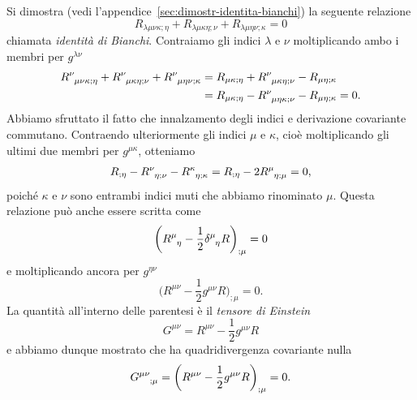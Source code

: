 Si dimostra (vedi l'appendice~\ref{sec:dimostr-identita-bianchi}) la seguente
relazione
\begin{equation}
  \label{eq:bianchi}
  R_{\lambda\mu\nu\kappa;\eta} + R_{\lambda\mu\kappa\eta;\nu} +
  R_{\lambda\mu\eta\nu;\kappa} = 0
\end{equation}
chiamata \emph{identità di Bianchi}.  Contraiamo gli
indici $\lambda$ e $\nu$ moltiplicando ambo i membri per $g^{\lambda\nu}$
\begin{equation}
  \begin{split}
    \tensor{R}{^{\nu}_{\mu\nu\kappa;\eta}} +
      \tensor{R}{^{\nu}_{\mu\kappa\eta;\nu}} +
    \tensor{R}{^{\nu}_{\mu\eta\nu;\kappa}} &= R_{\mu\kappa;\eta} +
    \tensor{R}{^{\nu}_{\mu\kappa\eta;\nu}} - R_{\mu\eta;\kappa} \\
    &= R_{\mu\kappa;\eta} - \tensor{R}{^{\nu}_{\mu\eta\kappa;\nu}} -
    R_{\mu\eta;\kappa} = 0.
  \end{split}
\end{equation}
Abbiamo sfruttato il fatto che innalzamento degli indici e derivazione
covariante commutano.  Contraendo ulteriormente gli indici $\mu$ e $\kappa$,
cioè moltiplicando gli ultimi due membri per $g^{\mu\kappa}$, otteniamo
\begin{equation}
  R_{;\eta} - \tensor{R}{^{\nu}_{\eta;\nu}} -
  \tensor{R}{^{\kappa}_{\eta;\kappa}} = R_{;\eta} - 2
  \tensor{R}{^{\mu}_{\eta;\mu}} = 0,
\end{equation}
poiché $\kappa$ e $\nu$ sono entrambi indici muti che abbiamo rinominato $\mu$.
Questa relazione può anche essere scritta come
\begin{equation}
  \bigg( \tensor{R}{^{\mu}_{\eta}} - \frac{1}{2} \tensor{\delta}{^{\mu}_{\eta}}
  R \bigg)_{;\mu} = 0
\end{equation}
e moltiplicando ancora per $g^{\eta\nu}$
\begin{equation}
  \bigg( R^{\mu\nu} - \frac{1}{2} g^{\mu\nu} R\bigg)_{;\mu} = 0.
\end{equation}
La quantità all'interno delle parentesi è il
\emph{tensore di Einstein}
\begin{equation}
  G^{\mu\nu} = R^{\mu\nu} - \frac{1}{2} g^{\mu\nu}R
\end{equation}
e abbiamo dunque mostrato che ha quadridivergenza covariante nulla
\begin{equation}
  \label{eq:divergenza-tens-einstein}
  \tensor{G}{^{\mu\nu}_{;\mu}} = \bigg( R^{\mu\nu} - \frac{1}{2} g^{\mu\nu}
  R\bigg)_{;\mu} = 0.
\end{equation}

